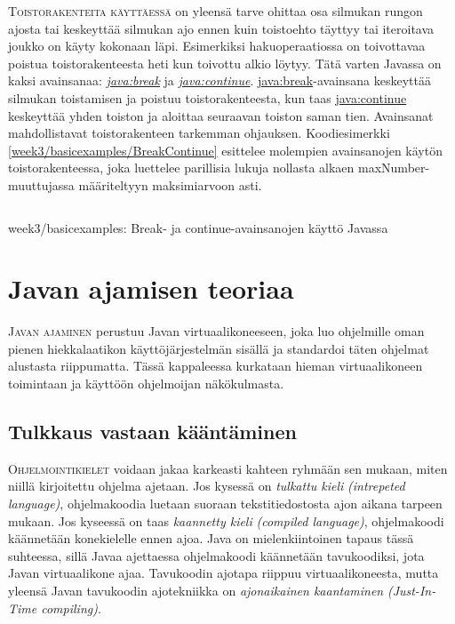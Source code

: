 \documentclass[openany]{book}
\newcommand{\newthought}[1]{\smallskip\textsc{#1}}
\newcommand{\eng}[1]{\textit{(#1)}}
\newcommand{\new}[1]{\textit{\gls{#1}}}
\newcommand{\neweng}[2]{\new{#1} \eng{#2}}
\newcommand{\java}[1]{\underline{\gls{java:#1}}}
\newcommand{\newjava}[1]{\textit{\java{#1}}}
\newcommand{\code}[3]{
	\begin{listing}
		\linespread{0.85}
		\inputminted{java}{OhjelmointiopasEsimerkit/src/#1/#2.java}
		\caption{#1: #3}
		\label{#1/#2}
	\end{listing}
}
\begin{document}
\newthought{Toistorakenteita käyttäessä} on yleensä tarve ohittaa osa silmukan rungon ajosta tai
keskeyttää silmukan ajo ennen kuin toistoehto täyttyy tai iteroitava joukko on käyty kokonaan
läpi. Esimerkiksi hakuoperaatiossa on toivottavaa poistua toistorakenteesta heti kun toivottu
alkio löytyy. Tätä varten Javassa on kaksi avainsanaa: \newjava{break} ja \newjava{continue}.
\java{break}-avainsana keskeyttää silmukan toistamisen ja poistuu toistorakenteesta, kun taas	
\java{continue} keskeyttää yhden toiston ja aloittaa seuraavan toiston saman tien. Avainsanat
mahdollistavat toistorakenteen tarkemman ohjauksen. Koodiesimerkki
\ref{week3/basicexamples/BreakContinue} esittelee molempien avainsanojen käytön toistorakenteessa,
joka luettelee parillisia lukuja nollasta alkaen maxNumber-muuttujassa määriteltyyn maksimiarvoon
asti.

\code{week3/basicexamples}{BreakContinue}{Break- ja continue-avainsanojen käyttö Javassa}


\section{Javan ajamisen teoriaa}
\label{virtuaalikoneesta}

\newthought{Javan ajaminen} perustuu Javan virtuaalikoneeseen, joka luo ohjelmille oman pienen
hiekkalaatikon käyttöjärjestelmän sisällä ja standardoi täten ohjelmat alustasta riippumatta.
Tässä kappaleessa kurkataan hieman virtuaalikoneen toimintaan ja käyttöön ohjelmoijan
näkökulmasta.

\subsection{Tulkkaus vastaan kääntäminen}
\label{JIT}

\newthought{Ohjelmointikielet} voidaan jakaa karkeasti kahteen ryhmään sen mukaan, miten niillä
kirjoitettu ohjelma ajetaan. Jos kysessä on \neweng{tulkattu kieli}{intrepeted language},
ohjelmakoodia luetaan suoraan tekstitiedostosta ajon aikana tarpeen mukaan. Jos kyseessä on taas
\neweng{kaannetty kieli}{compiled language}, ohjelmakoodi käännetään konekielelle ennen ajoa. Java
on mielenkiintoinen tapaus tässä suhteessa, sillä Javaa ajettaessa ohjelmakoodi käännetään
tavukoodiksi, jota Javan virtuaalikone ajaa. Tavukoodin ajotapa riippuu virtuaalikoneesta, mutta
yleensä Javan tavukoodin ajotekniikka on
\neweng{ajonaikainen kaantaminen}{Just-In-Time compiling}.
\end{document}
